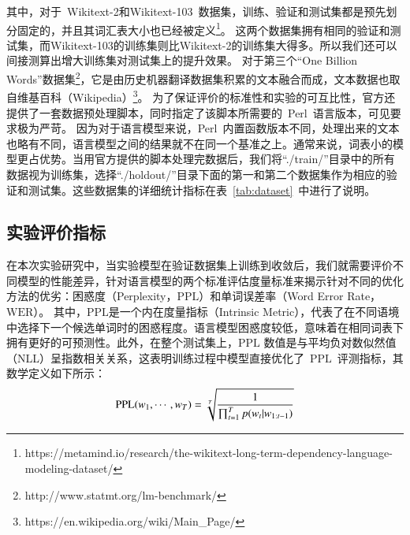 其中，对于~Wikitext-2和Wikitext-103~数据集，训练、验证和测试集都是预先划分固定的，并且其词汇表大小也已经被定义\footnote{https://metamind.io/research/the-wikitext-long-term-dependency-language-modeling-dataset/}。
这两个数据集拥有相同的验证和测试集，而Wikitext-103的训练集则比Wikitext-2的训练集大得多。所以我们还可以间接测算出增大训练集对测试集上的提升效果。
对于第三个``One Billion Words''数据集\footnote{http://www.statmt.org/lm-benchmark/}，它是由历史机器翻译数据集积累的文本融合而成，文本数据也取自维基百科（Wikipedia）\footnote{https://en.wikipedia.org/wiki/Main\_Page/}。
为了保证评价的标准性和实验的可互比性，官方还提供了一套数据预处理脚本，同时指定了该脚本所需要的~Perl~语言版本，可见要求极为严苛。
因为对于语言模型来说，Perl~内置函数版本不同，处理出来的文本也略有不同，语言模型之间的结果就不在同一个基准之上。通常来说，词表小的模型更占优势。当用官方提供的脚本处理完数据后，我们将``./train/''目录中的所有数据视为训练集，选择``./holdout/''目录下面的第一和第二个数据集作为相应的验证和测试集。这些数据集的详细统计指标在表~\ref{tab:dataset}~中进行了说明。

\subsection{实验评价指标}
在本次实验研究中，当实验模型在验证数据集上训练到收敛后，我们就需要评价不同模型的性能差异，针对语言模型的两个标准评估度量标准来揭示针对不同的优化方法的优劣：困惑度（Perplexity，$ \mathrm{PPL} $）和单词误差率（Word Error Rate，$\mathrm{WER} $）。
其中，$ \mathrm{PPL} $是一个内在度量指标（Intrinsic Metric），代表了在不同语境中选择下一个候选单词时的困惑程度。语言模型困惑度较低，意味着在相同词表下拥有更好的可预测性。此外，在整个测试集上，$\mathrm{PPL}$ 数值是与平均负对数似然值（NLL）呈指数相关关系，这表明训练过程中模型直接优化了~$ \mathrm{PPL} $~评测指标，其数学定义如下所示：
\begin{equation}\label{equ:ppl}
\setlength{\abovedisplayskip}{6pt}
\setlength{\belowdisplayskip}{6pt}
   \mathrm{PPL}(w_1,\cdots,w_T)=\sqrt[T]{\frac{1}{\prod_{t=1}^T p(w_t|w_{1:t-1})}}
\end{equation}

